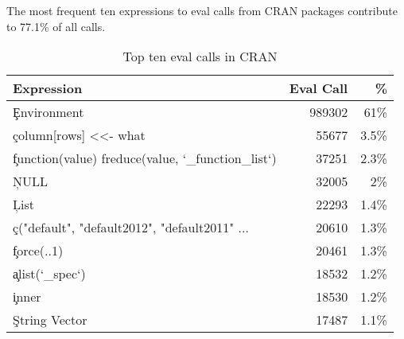 \documentclass[acmsmall]{acmart}
\begin{document}
The most frequent ten expressions to eval calls from CRAN packages
contribute to 77.1\% of all \eval calls.

\begin{table}[!h]  \centering
\begin{tabular}{@{}l@{~}|@{~}r@{~}r@{}} \hline
Expression & Eval Call &  \% \\\hline
\c{Environment} &                                  989302   & 61\%\\
\c{column[rows] <<- what} &                        55677    & 3.5\%\\
\c{function(value) freduce(value, `_function_list`)} & 37251& 2.3\%\\
\c{NULL} &                         32005    & 2\%\\
\c{List} &                         22293    & 1.4\%\\
\c{c("default", "default2012", "default2011" ...}& 20610    & 1.3\%\\
\c{force(..1)}            &                        20461    & 1.3\%\\
\c{alist(`_spec`)}       &                         18532    & 1.2\%\\
\c{inner}               &                          18530    & 1.2\%\\
\c{String Vector}      &                           17487     & 1.1\%\\
\end{tabular}\caption{Top ten eval calls in CRAN} \label{C}
\end{table}
\end{document}
